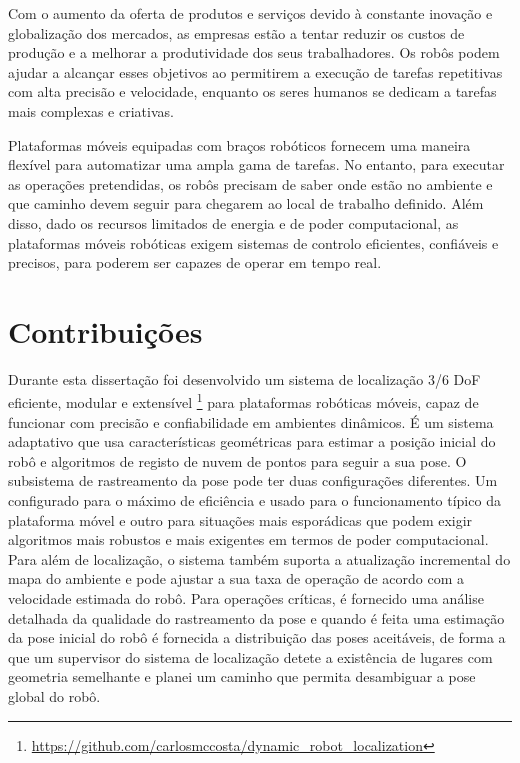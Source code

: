 \documentclass[9pt,a4paper]{extarticle}
\begin{document}
\begin{multicols}{2}
Com o aumento da oferta de produtos e serviços devido à constante inovação e globalização dos mercados, as empresas estão a tentar reduzir os custos de produção e a melhorar a produtividade dos seus trabalhadores. Os robôs podem ajudar a alcançar esses objetivos ao permitirem a execução de tarefas repetitivas com alta precisão e velocidade, enquanto os seres humanos se dedicam a tarefas mais complexas e criativas.

Plataformas móveis equipadas com braços robóticos fornecem uma maneira flexível para automatizar uma ampla gama de tarefas. No entanto, para executar as operações pretendidas, os robôs precisam de saber onde estão no ambiente e que caminho devem seguir para chegarem ao local de trabalho definido. Além disso, dado os recursos limitados de energia e de poder computacional, as plataformas móveis robóticas exigem sistemas de controlo eficientes, confiáveis e precisos, para poderem ser capazes de operar em tempo real.


\section{Contribuições}

Durante esta dissertação foi desenvolvido um sistema de localização 3/6 DoF eficiente, modular e extensível \footnote{\url{https://github.com/carlosmccosta/dynamic_robot_localization}} para plataformas robóticas móveis, capaz de funcionar com precisão e confiabilidade em ambientes dinâmicos. É um sistema adaptativo que usa características geométricas para estimar a posição inicial do robô e algoritmos de registo de nuvem de pontos para seguir a sua pose. O subsistema de rastreamento da pose pode ter duas configurações diferentes. Um configurado para o máximo de eficiência e usado para o funcionamento típico da plataforma móvel e outro para situações mais esporádicas que podem exigir algoritmos mais robustos e mais exigentes em termos de poder computacional. Para além de localização, o sistema também suporta a atualização incremental do mapa do ambiente e pode ajustar a sua taxa de operação de acordo com a velocidade estimada do robô. Para operações críticas, é fornecido uma análise detalhada da qualidade do rastreamento da pose e quando é feita uma estimação da pose inicial do robô é fornecida a distribuição das poses aceitáveis, de forma a que um supervisor do sistema de localização detete a existência de lugares com geometria semelhante e planei um caminho que permita desambiguar a pose global do robô.



\end{multicols}
\end{document}
